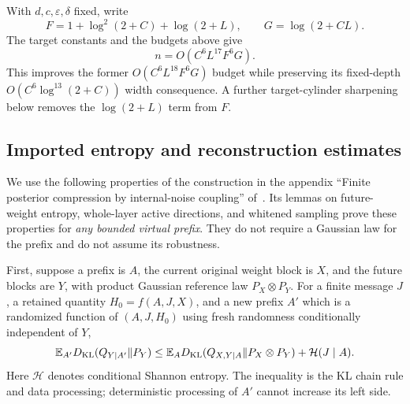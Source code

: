 With $d,c,\varepsilon,\delta$ fixed, write
\[
 F=1+\log^2(2+C)+\log(2+L),\qquad G=\log(2+CL).
\]
The target constants and the budgets above give
\begin{equation}\label{eq:all-scales-sequential-rate}
 n=O(C^6L^{17}F^6G).
\end{equation}
This improves the former $O(C^6L^{18}F^6G)$ budget while preserving its
fixed-depth $O(C^6\log^{13}(2+C))$ width consequence.
A further target-cylinder sharpening below removes the $\log(2+L)$
term from $F$.

\subsection{Imported entropy and reconstruction estimates}

We use the following properties of the construction in the appendix
``Finite posterior compression by internal-noise coupling''
of~\cite{all-scales}. Its lemmas on future-weight entropy, whole-layer
active directions, and whitened sampling prove these properties for
\emph{any bounded virtual prefix}. They do not require a Gaussian law
for the prefix and do not assume its robustness.

First, suppose a prefix is $A$, the current original weight block is $X$,
and the future blocks are $Y$, with product Gaussian reference law
$P_X\otimes P_Y$. For a finite message $J$, a retained quantity
$H_0=f(A,J,X)$, and a new prefix $A'$ which is a randomized function of
$(A,J,H_0)$ using fresh randomness conditionally independent of $Y$,
\begin{equation}\label{eq:imported-future-entropy}
 \mathbb E_{A'}D_{\rm KL}(Q_{Y\mid A'}\Vert P_Y)
 \le \mathbb E_A D_{\rm KL}(Q_{X,Y\mid A}\Vert P_X\otimes P_Y)
       +\mathcal H(J\mid A).
\end{equation}
Here $\mathcal H$ denotes conditional Shannon entropy. The inequality
is the KL chain rule and data processing; deterministic processing of
$A'$ cannot increase its left side.

